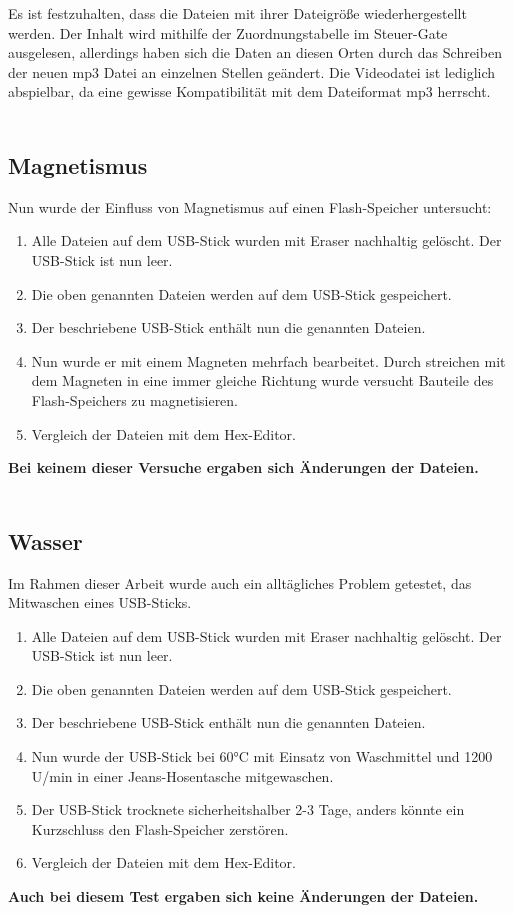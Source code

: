 \documentclass[10pt,a4paper]{article} %
\begin{document}
Es ist festzuhalten, dass die Dateien mit ihrer Dateigröße wiederhergestellt werden. Der Inhalt wird mithilfe der Zuordnungstabelle im Steuer-Gate ausgelesen, allerdings haben sich die Daten an diesen Orten durch das Schreiben der neuen mp3 Datei an einzelnen Stellen geändert. Die Videodatei ist lediglich abspielbar, da eine gewisse Kompatibilität mit dem Dateiformat mp3 herrscht.\\\\




\subsection{Magnetismus}
Nun wurde der Einfluss von Magnetismus auf einen Flash-Speicher untersucht:
\begin{enumerate}
\item Alle Dateien auf dem USB-Stick wurden mit Eraser nachhaltig gelöscht. Der USB-Stick ist nun \glqq leer\grqq{}.
\item Die oben genannten Dateien werden auf dem USB-Stick gespeichert.
\item Der beschriebene USB-Stick enthält nun die genannten Dateien.
\item Nun wurde er mit einem Magneten mehrfach bearbeitet. Durch streichen mit dem Magneten in eine immer gleiche Richtung wurde versucht Bauteile des Flash-Speichers zu magnetisieren. 
\item Vergleich der Dateien mit dem Hex-Editor.
\end{enumerate}
\textbf{Bei keinem dieser Versuche ergaben sich Änderungen der Dateien.}\\\\

\newpage
\subsection{Wasser}
Im Rahmen dieser Arbeit wurde auch ein alltägliches Problem getestet, das Mitwaschen eines USB-Sticks. 
\begin{enumerate}
\item Alle Dateien auf dem USB-Stick wurden mit Eraser nachhaltig gelöscht. Der USB-Stick ist nun \glqq leer\grqq{}.
\item Die oben genannten Dateien werden auf dem USB-Stick gespeichert.
\item Der beschriebene USB-Stick enthält nun die genannten Dateien.
\item Nun wurde der USB-Stick bei 60°C mit Einsatz von Waschmittel und 1200 U/min  in einer Jeans-Hosentasche mitgewaschen. 
\item Der USB-Stick trocknete sicherheitshalber 2-3 Tage, anders könnte ein Kurzschluss den Flash-Speicher zerstören.
\item Vergleich der Dateien mit dem Hex-Editor.
\end{enumerate}
\textbf{Auch bei diesem Test ergaben sich keine Änderungen der Dateien.}\\\\
\end{document}
